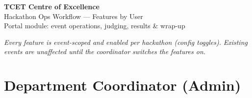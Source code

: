 \documentclass[11pt,a4paper]{article}
\begin{document}
\begin{tcolorbox}[colback=navy,colframe=navy,boxrule=0pt,arc=0pt,left=14pt,right=14pt,top=10pt,bottom=10pt]
{\color{white}\LARGE\bfseries TCET Centre of Excellence}\\[2pt]
{\color{gold}\large Hackathon Ops Workflow --- Features by User}\\[2pt]
{\color{white}\small Portal module: event operations, judging, results \& wrap-up}
\end{tcolorbox}
\vspace{0.6em}

\noindent\textit{Every feature is event-scoped and enabled per hackathon (config toggles).}
\textit{Existing events are unaffected until the coordinator switches the features on.}

\section{Department Coordinator (Admin)}
\end{document}
